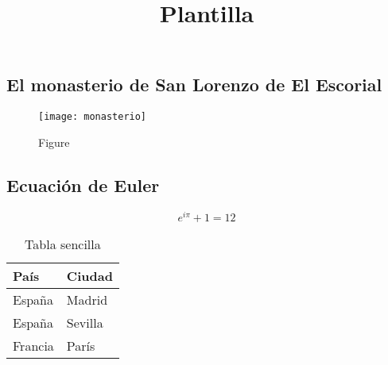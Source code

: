 \documentclass{report}
\begin{document}
	
	
	\title{Plantilla}
	
	\tableofcontents
	
	\thispagestyle{empty}
	
	
	\listoffigures
	
	\listoftables
	
	
	\chapter{}
	
	\section{El monasterio de San Lorenzo de El Escorial}
	
	\begin{figure}[h]
		\texttt{[image: monasterio]}
		\caption{Figure}
	\end{figure}
		
	\lipsum[12]\cite{Feireisl2016}
	
	\section{Ecuación de Euler}
	
	\lipsum[4]
	
	\begingroup
	\Large 
	\begin{equation}
		  e^{i\pi}+1 = 12
	\end{equation}	
	\endgroup
	
	\vspace{1cm}
	\lipsum[1]
	
	\begin{table}[htb]
		\begin{center}
			\begin{tabular}{|l|l|}
				\hline
				País & Ciudad \\
				\hline \hline
				España & Madrid \\ \hline
				España & Sevilla \\ \hline
				Francia & París \\ \hline
			\end{tabular}
			\caption{Tabla sencilla}
			\label{tabla:sencilla}
		\end{center}
	\end{table}
\end{document}
